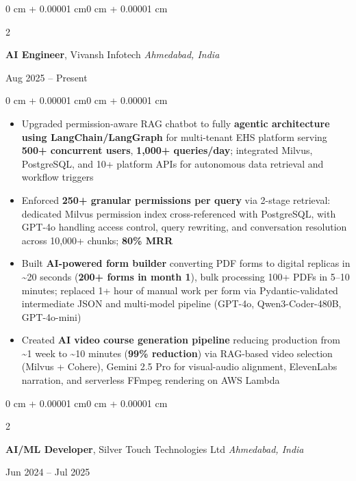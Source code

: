 \documentclass[10pt, letterpaper]{article}
\newenvironment{highlights}{
    \begin{itemize}[
        topsep=0.01 cm,
        parsep=0.01 cm,
        partopsep=0pt,
        itemsep=0pt,
        leftmargin=0 cm + 10pt
    ]
}{
    \end{itemize}
}
\newenvironment{onecolentry}{
    \begin{adjustwidth}{0 cm + 0.00001 cm}{0 cm + 0.00001 cm}
}{
    \end{adjustwidth}
}
\newenvironment{twocolentry}[2][]{
    \onecolentry
    \def\secondColumn{#2}
    \setcolumnwidth{\fill, 5.5 cm}
    \begin{paracol}{2}
}{
    \switchcolumn \raggedleft \secondColumn
    \end{paracol}
    \endonecolentry
}
\begin{document}
        \begin{twocolentry}{
            Aug 2025 -- Present
        }
            \textbf{AI Engineer}, Vivansh Infotech \hfill \textit{Ahmedabad, India}
        \end{twocolentry}

        \vspace{0.02 cm}
        \begin{onecolentry}
            \begin{highlights}
                \item Upgraded permission-aware RAG chatbot to fully \textbf{agentic architecture using LangChain/LangGraph} for multi-tenant EHS platform serving \textbf{500+ concurrent users}, \textbf{1,000+ queries/day}; integrated Milvus, PostgreSQL, and 10+ platform APIs for autonomous data retrieval and workflow triggers
                \item Enforced \textbf{250+ granular permissions per query} via 2-stage retrieval: dedicated Milvus permission index cross-referenced with PostgreSQL, with GPT-4o handling access control, query rewriting, and conversation resolution across 10,000+ chunks; \textbf{80\% MRR}
                \item Built \textbf{AI-powered form builder} converting PDF forms to digital replicas in \textasciitilde20 seconds (\textbf{200+ forms in month 1}), bulk processing 100+ PDFs in 5--10 minutes; replaced 1+ hour of manual work per form via Pydantic-validated intermediate JSON and multi-model pipeline (GPT-4o, Qwen3-Coder-480B, GPT-4o-mini)
                \item Created \textbf{AI video course generation pipeline} reducing production from \textasciitilde1 week to \textasciitilde10 minutes (\textbf{99\% reduction}) via RAG-based video selection (Milvus + Cohere), Gemini 2.5 Pro for visual-audio alignment, ElevenLabs narration, and serverless FFmpeg rendering on AWS Lambda
            \end{highlights}
        \end{onecolentry}

        \vspace{0.05 cm}

        \begin{twocolentry}{
            Jun 2024 -- Jul 2025
        }
            \textbf{AI/ML Developer}, Silver Touch Technologies Ltd \hfill \textit{Ahmedabad, India}
        \end{twocolentry}
\end{document}
